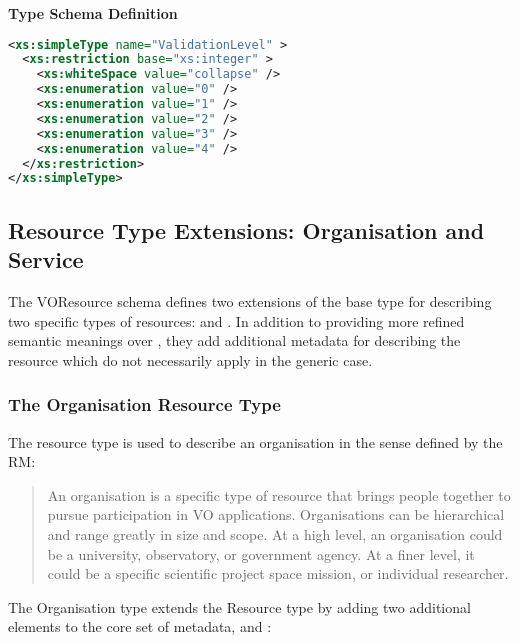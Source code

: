 \documentclass[11pt,a4paper]{ivoa}
\begin{document}
\begin{generated}
\begin{longtermsdescription}
\end{longtermsdescription}
\vspace{1ex}\noindent\textbf{ Type Schema Definition}

\begin{lstlisting}[language=XML,basicstyle=\footnotesize]
<xs:simpleType name="ValidationLevel" >
  <xs:restriction base="xs:integer" >
    <xs:whiteSpace value="collapse" />
    <xs:enumeration value="0" />
    <xs:enumeration value="1" />
    <xs:enumeration value="2" />
    <xs:enumeration value="3" />
    <xs:enumeration value="4" />
  </xs:restriction>
</xs:simpleType>
\end{lstlisting}\endgroup
\end{generated}



\subsection{Resource Type Extensions:  Organisation and Service}

The VOResource schema defines two extensions of the base
 type for describing two specific types of
resources:   and .  In
addition to providing more refined semantic meanings over
, they add additional metadata for
describing the resource which do not necessarily apply in the generic
case.



\subsubsection{The Organisation Resource Type}


The  resource type is used to describe an organisation in
the sense defined by the RM:


\begin{quotation}
An organisation is a specific type of resource that brings people
together to pursue participation in VO applications.  Organisations
can be hierarchical and range greatly in size and scope.  At a high
level, an organisation could be a university, observatory, or
government agency.  At a finer level, it could be a specific
scientific project space mission, or individual researcher.
\end{quotation}


The Organisation type extends the Resource type by adding two additional
elements to the core set of metadata,  and
:
\end{document}
